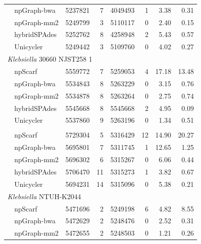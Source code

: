 \documentclass[10pt,twocolumn,twoside]{genpaper}
\begin{document}
\begin{longtable}[!hpt]{llcrrrrr}
& npGraph-bwa & 5237821  &  7  &  4049493  &  1  &  3.38 & 0.31\\*
\rowcolor{Gray}
& npGraph-mm2 &  5249799 &  3  &  5110117  &  0  &  2.40 & 0.15\\*
\rowcolor{Gray}
& hybridSPAdes & 5252762  &  8  &  4258948  &  2  &  5.43 &  0.57\\*
\rowcolor{Gray}
& Unicycler & 5249442  &  3  &  5109760  &  0  & 4.02 & 0.27 \\
\hline
\multicolumn{8}{l}{\emph{Klebsiella} 30660 NJST258 1} \\* %
\nobreakmidrule
& npScarf & 5559772  &  7  &  5259053  &  4  & 17.18  & 13.48\\*
& npGraph-bwa & 5534843  &  8  &  5263229  &  0  & 3.15  & 0.76\\*
& npGraph-mm2 & 5534878  &  8  &  5263264  &  0  & 2.75  & 0.74\\*
& hybridSPAdes &  5545668 & 8   &  5545668  &  2  & 4.95  & 0.09 \\*
& Unicycler & 5537860  &  9  &  5263196  &  0  & 1.34  & 0.51 \\
\hline
\rowcolor{Gray}
\multicolumn{8}{l}{\emph{Klebsiella} MGH 78578} \\* %
\nobreakmidrule
\rowcolor{Gray}
& npScarf &  5729304 &  5  &  5316429  &  12  & 14.90  & 20.27\\*
\rowcolor{Gray}
& npGraph-bwa &  5695801 &  7  &  5311745  &  1  & 12.65  & 1.25\\*
\rowcolor{Gray}
& npGraph-mm2 & 5696302  &  6  &  5315267  &  0  &  6.06 & 0.44\\*
\rowcolor{Gray}
& hybridSPAdes &  5706470 &  11  &  5315273  &  1  & 3.82  &  0.67\\*
\rowcolor{Gray}
& Unicycler &  5694231 &  14  &  5315096  &  0  & 5.38 &  0.21\\
\hline
\multicolumn{8}{l}{\emph{Klebsiella} NTUH-K2044} \\* %
\nobreakmidrule
& npScarf & 5471696  &  2  &  5249198  &  6  & 4.82  &  8.55\\*
& npGraph-bwa & 5472629  &  2  &  5248476  & 0  & 2.52  &  0.31\\*
& npGraph-mm2 &  5472655 &  2  &  5248503  &  0 &  1.21 &  0.26\\*

\end{longtable}
\end{document}
